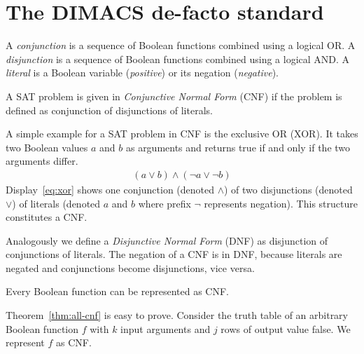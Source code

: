 \section{The DIMACS de-facto standard}
\label{sec:sat-dimacs}
%
\begin{defi}
  A \emph{conjunction} is a sequence of Boolean functions combined using
  a logical OR. A \emph{disjunction} is a sequence of Boolean functions
  combined using a logical AND. A \emph{literal} is a Boolean variable
  (\emph{positive}) or its negation (\emph{negative}).

  A SAT problem is given in \emph{Conjunctive Normal Form} (CNF) if
  the problem is defined as conjunction of disjunctions of literals.
\end{defi}

A simple example for a SAT problem in CNF is the exclusive OR (XOR).
It takes two Boolean values $a$ and $b$ as arguments and returns true
if and only if the two arguments differ.
{
\setlength{\abovedisplayskip}{5pt}
\setlength{\belowdisplayskip}{5pt}
\setlength{\abovedisplayshortskip}{0pt}
\setlength{\belowdisplayshortskip}{0pt}
\begin{align} (a \lor b) \land (\neg a \lor \neg b) \label{eq:xor}\end{align}
}
Display~\ref{eq:xor} shows one conjunction (denoted $\land$) of two disjunctions
(denoted $\lor$) of literals (denoted $a$ and $b$ where prefix $\neg$ represents
negation). This structure constitutes a CNF.

Analogously we define a \emph{Disjunctive Normal Form} (DNF) as disjunction
of conjunctions of literals. The negation of a CNF is in DNF, because literals
are negated and conjunctions become disjunctions, vice versa.

\begin{theorem}
  \label{thm:all-cnf}
  Every Boolean function can be represented as CNF.
\end{theorem}

Theorem~\ref{thm:all-cnf} is easy to prove.
%
Consider the truth table of an arbitrary Boolean function $f$ with $k$ input arguments
and $j$ rows of output value false. We represent $f$ as CNF.

